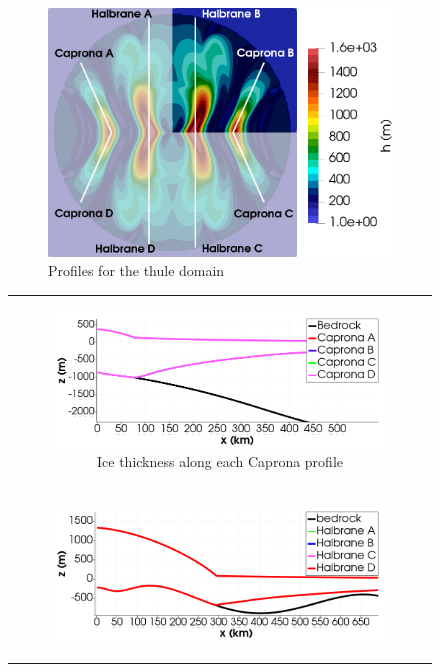 \documentclass{article}
\begin{document}
\begin{figure}[!h]
  \begin{subfigure}[c]{.52\linewidth}
    \centering
    \includegraphics[width=\linewidth]{../fig/Profiles_Thule_combined_domains_2_con_fondo.png}%
    \caption
      {%
        Profiles for the thule domain%
        \label{Profiles_Thule}%
      }%
  \end{subfigure}\hfill
  \begin{tabular}[c]{@{}c@{}}
    \begin{subfigure}[c]{.48\linewidth}
      \centering
      \includegraphics[width=\linewidth]{../fig/Capronas_Thule_Domain_con_fondo.png}%
      \caption
        {%
          Ice thickness along each Caprona profile%
          \label{Capronas_thule}%
        }%
    \end{subfigure}\\
    \noalign{\bigskip}%
    \begin{subfigure}[c]{.48\linewidth}
      \centering
      \includegraphics[width=\linewidth,page=2]{../fig/Halbranes_thule_domain_con_fondo.png}%

\end{subfigure}
\end{tabular}
\end{figure}
\end{document}
